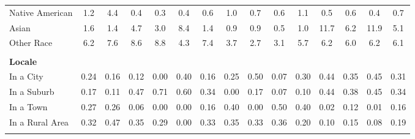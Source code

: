 \begin{tabular*}{\linewidth}{@{\extracolsep{\fill} } lcccccccccccccc}
\hspace{0.2cm}Native American&1.2&4.4&0.4&0.3&0.4&0.6&1.0&0.7&0.6&1.1&0.5&0.6&0.4&0.7\\%
\hspace{0.2cm}Asian&1.6&1.4&4.7&3.0&8.4&1.4&0.9&0.9&0.5&1.0&11.7&6.2&11.9&5.1\\%
\hspace{0.2cm}Other Race&6.2&7.6&8.6&8.8&4.3&7.4&3.7&2.7&3.1&5.7&6.2&6.0&6.2&6.1\\%
&&&&&&&&&&&&&&\\%
\multicolumn{15}{l}{\bfseries Locale}\\%
\hspace{0.2cm}In a City&0.24&0.16&0.12&0.00&0.40&0.16&0.25&0.50&0.07&0.30&0.44&0.35&0.45&0.31\\%
\hspace{0.2cm}In a Suburb&0.17&0.11&0.47&0.71&0.60&0.34&0.00&0.17&0.07&0.10&0.44&0.38&0.45&0.34\\%
\hspace{0.2cm}In a Town&0.27&0.26&0.06&0.00&0.00&0.16&0.40&0.00&0.50&0.40&0.02&0.12&0.01&0.16\\%
\hspace{0.2cm}In a Rural Area&0.32&0.47&0.35&0.29&0.00&0.33&0.35&0.33&0.36&0.20&0.10&0.15&0.08&0.19\\%
&&&&&&&&&&&&&&\\%
\hline%
\end{tabular*}